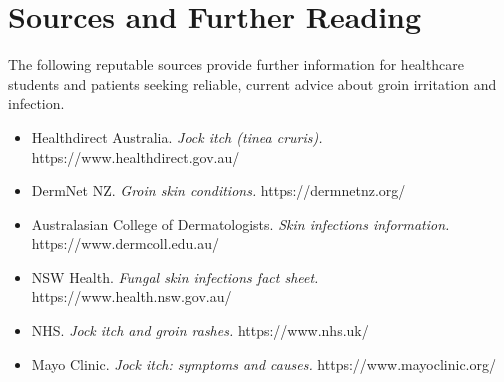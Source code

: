 \section*{Sources and Further Reading}
The following reputable sources provide further information for healthcare students and patients seeking reliable, current advice about groin irritation and infection.

\begin{itemize}
    \item Healthdirect Australia. \textit{Jock itch (tinea cruris).} https://www.healthdirect.gov.au/
    \item DermNet NZ. \textit{Groin skin conditions.} https://dermnetnz.org/
    \item Australasian College of Dermatologists. \textit{Skin infections information.} https://www.dermcoll.edu.au/
    \item NSW Health. \textit{Fungal skin infections fact sheet.} https://www.health.nsw.gov.au/
    \item NHS. \textit{Jock itch and groin rashes.} https://www.nhs.uk/
    \item Mayo Clinic. \textit{Jock itch: symptoms and causes.} https://www.mayoclinic.org/
\end{itemize}
